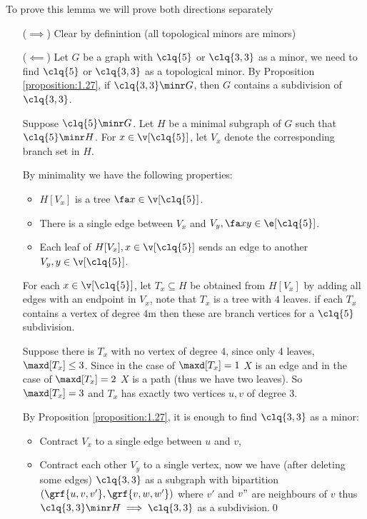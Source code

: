 \begin{prf}
    To prove this lemma we will prove both directions separately
    \begin{itemize}
        \item [($\implies$)] Clear by definintion (all topological minors are minors)
        \item [($\impliedby$)] Let $G$ be a graph with $\clq{5}$ or $\clq{3, 3}$ as a minor, we need to find $\clq{5}$ or $\clq{3, 3}$ as a topological minor. By Proposition \ref{proposition:1.27}, if $\clq{3, 3} \minr G$, then $G$ contains a subdivision of $\clq{3, 3}$.
        
        Suppose $\clq{5} \minr G$. Let $H$ be a minimal subgraph of $G$ such that $\clq{5} \minr H$. For $x \in \v[\clq{5}]$, let $V_x$ denote the corresponding branch set in $H$.

        By minimality we have the following properties:
        \begin{itemize}
            \item $H[V_x]$ is a tree $\fa x \in \v[\clq{5}]$.
            \item There is a single edge between $V_x$ and $V_y, \fa xy \in \e[\clq{5}]$.
            \item Each leaf of $H[V_x], x \in \v[\clq{5}]$ sends an edge to another $V_y, y \in \v[\clq{5}]$.
        \end{itemize}
        For each $x \in \v[\clq{5}]$, let $T_x \subseteq H$ be obtained from $H[V_x]$ by adding all edges with an endpoint in $V_x$, note that $T_x$ is a tree with $4$ leaves. if each $T_x$ contains a vertex of degree $4$m then these are branch vertices for a $\clq{5}$ subdivision.

        Suppose there is $T_x$ with no vertex of degree $4$, since only $4$ leaves, $\maxd[T_x] \leq 3$. Since in the case of $\maxd[T_x] = 1$ $X$ is an edge and in the case of $\maxd[T_x] = 2$ $X$ is a path (thus we have two leaves). So $\maxd[T_x] = 3$  and $T_x$ has exactly two vertices $u, v$ of degree $3$.

        By Proposition \ref{proposition:1.27}, it is enough to find $\clq{3, 3}$ as a minor:
        \begin{itemize}
            \item Contract $V_x$ to a single edge between $u$ and $v$,
            \item Contract each other $V_y$ to a single vertex, now we have (after deleting some edges) $\clq{3, 3}$ as a subgraph with bipartition $(\grf{u, v, v'}, \grf{v, w, w'})$ where $v'$ and $v"$ are neighbours of $v$ thus $\clq{3, 3} \minr H \implies \clq{3, 3}$ as a subdivision.\qed
        \end{itemize}
    \end{itemize}
\end{prf}

